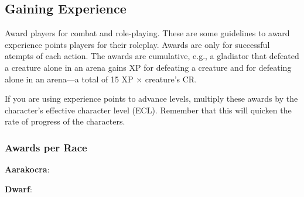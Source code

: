 
\subsection{Gaining Experience}
Award players for combat and role-playing. These are some guidelines to award experience points players for their roleplay. Awards are only for successful atempts of each action. The awards are cumulative, e.g., a gladiator that defeated a creature alone in an arena gains XP for defeating a creature and for defeating alone in an arena---a total of 15 XP $\times$ creature's CR.

If you are using experience points to advance levels, multiply these awards by the character's effective character level (ECL). Remember that this will quicken the rate of progress of the characters.

\subsubsection{Awards per Race}
\textbf{Aarakocra}:

\textbf{Dwarf}:

